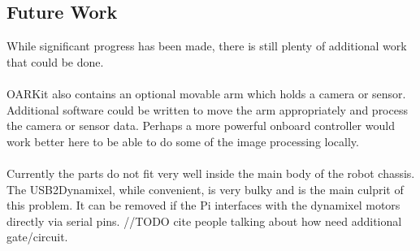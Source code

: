\documentclass[]{article}
\begin{document}
\subsection{Future Work}
While significant progress has been made, there is still plenty of additional work that could be done.
\\
\\
OARKit also contains an optional movable arm which holds a camera or sensor. Additional software could be written to move the arm appropriately and process the camera or sensor data. Perhaps a more powerful onboard controller would work better here to be able to do some of the image processing locally.
\\
\\
Currently the parts do not fit very well inside the main body of the robot chassis. The USB2Dynamixel, while convenient, is very bulky and is the main culprit of this problem. It can be removed if the Pi interfaces with the dynamixel motors directly via serial pins. //TODO cite people talking about how need additional gate/circuit.
\end{document}
